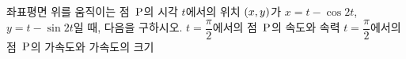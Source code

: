 좌표평면 위를 움직이는 점~$\mathrm{P}$의 시각 $t$에서의 위치 $(x{,}\mkern3mu\mathopen{}y)$가 $x=t-\cos 2t$, $y=t-\sin 2t$일 때, 다음을 구하시오.
 $t=\dfrac{\pi}{2}$에서의 점~$\mathrm{P}$의 속도와 속력
 $t=\dfrac{\pi}{2}$에서의 점~$\mathrm{P}$의 가속도와 가속도의 크기
